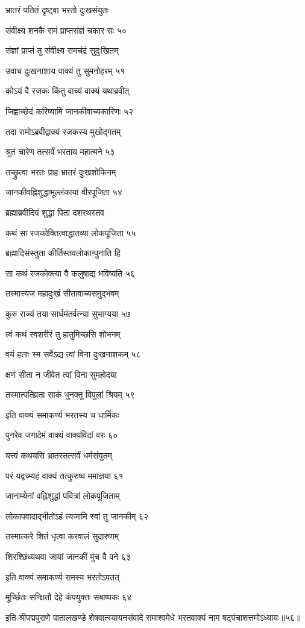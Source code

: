 भ्रातरं पतितं दृष्ट्वा भरतो दुःखसंयुतः

संवीक्ष्य शनकै रामं प्राप्तसंज्ञं चकार सः ५०

संज्ञां प्राप्तं तु संवीक्ष्य रामचंद्रं सुदुःखितम्

उवाच दुःखनाशाय वाक्यं तु सुमनोहरम् ५१

कोऽयं वै रजकः किंतु वाच्यं वाक्यं यथाब्रवीत्

जिह्वाच्छेदं करिष्यामि जानकीवाच्यकारिणः ५२

तदा रामोऽब्रवीद्वाक्यं रजकस्य मुखोद्गतम्

श्रुतं चारेण तत्सर्वं भरताय महात्मने ५३

तच्छ्रुत्वा भरतः प्राह भ्रातरं दुःखशोकिनम्

जानकीवह्निशुद्धाभूल्लंकायां वीरपूजिता ५४

ब्रह्माब्रवीदियं शुद्धा पिता दशरथस्तव

कथं सा रजकोक्तित्वाद्धातव्या लोकपूजिता ५५

ब्रह्मादिसंस्तुता कीर्तिस्तवलोकान्पुनाति हि

सा कथं रजकोक्त्या वै कलुषाद्य भविष्यति ५६

तस्मात्त्यज महादुःखं सीतावाच्यसमुद्भवम्

कुरु राज्यं तया सार्धमंतर्वत्न्या सुभाग्यया ५७

त्वं कथं स्वशरीरं तु हातुमिच्छसि शोभनम्

वयं हताः स्म सर्वेऽद्य त्वां विना दुःखनाशकम् ५८

क्षणं सीता न जीवेत त्वां विना सुमहोदया

तस्मात्पतिव्रता साकं भुनक्तु विपुलां श्रियम् ५९

इति वाक्यं समाकर्ण्य भरतस्य च धार्मिकः

पुनरेव जगादेमं वाक्यं वाक्यविदां वरः ६०

यत्त्वं कथयसि भ्रातस्तत्सर्वं धर्मसंयुतम्

परं यद्वच्म्यहं वाक्यं तत्कुरुष्व ममाज्ञया ६१

जानाम्येनां वह्निशुद्धां पवित्रां लोकपूजिताम्

लोकापवादाद्भीतोऽहं त्यजामि स्वां तु जानकीम् ६२

तस्मात्करे शितं धृत्वा करवालं सुदारुणम्

शिरश्छिंध्यथवा जायां जानकीं मुंच वै वने ६३

इति वाक्यं समाकर्ण्य रामस्य भरतोऽपतत्

मूर्च्छितः सन्क्षितौ देहे कंपयुक्तः सबाष्पकः ६४

इति श्रीपद्मपुराणे पातालखण्डे शेषवात्स्यायनसंवादे रामाश्वमेधे भरतवाक्यं नाम षट्पंचाशत्तमोऽध्यायः॥५६॥

